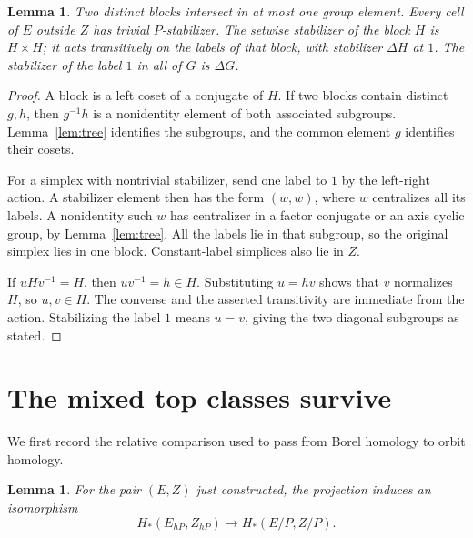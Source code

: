 \documentclass[11pt]{article}
\newtheorem{lemma}[theorem]{Lemma}
\theoremstyle{remark}
\begin{document}
\begin{lemma}\label{lem:blocks}
Two distinct blocks intersect in at most one group element. Every cell
of \(E\) outside \(Z\) has trivial \(P\)-stabilizer. The setwise stabilizer
of the block \(H\) is \(H\times H\); it acts transitively on the labels of
that block, with stabilizer \(\Delta H\) at \(1\). The stabilizer of
the label \(1\) in all of \(G\) is \(\Delta G\).
\end{lemma}

\begin{proof}
A block is a left coset of a conjugate of \(H\). If two blocks contain
distinct \(g,h\), then \(g^{-1}h\) is a nonidentity element of both
associated subgroups. Lemma~\ref{lem:tree} identifies the subgroups,
and the common element \(g\) identifies their cosets.

For a simplex with nontrivial stabilizer, send one label to \(1\) by
the left-right action. A stabilizer element then has the form \((w,w)\),
where \(w\) centralizes all its labels. A nonidentity such \(w\) has
centralizer in a factor conjugate or an axis cyclic group, by
Lemma~\ref{lem:tree}. All the labels lie in that subgroup, so the
original simplex lies in one block. Constant-label simplices also
lie in \(Z\).

If \(uHv^{-1}=H\), then \(uv^{-1}=h\in H\). Substituting \(u=hv\)
shows that \(v\) normalizes \(H\), so \(u,v\in H\).
The converse and the asserted transitivity are immediate from the
action. Stabilizing the label \(1\) means \(u=v\), giving the two
diagonal subgroups as stated.
\end{proof}

\section{The mixed top classes survive}

We first record the relative comparison used to pass from Borel homology
to orbit homology.

\begin{lemma}\label{lem:relative}
For the pair \((E,Z)\) just constructed, the projection induces an
isomorphism
\[
 H_*(E_{hP},Z_{hP})\longrightarrow H_*(E/P,Z/P).
\]
\end{lemma}
\end{document}
